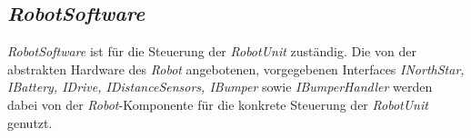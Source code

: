 \subsection{\textit{RobotSoftware}}

\emph{RobotSoftware} ist für die Steuerung der \textit{RobotUnit} zuständig. 
Die von der abstrakten Hardware des \textit{Robot} angebotenen, vorgegebenen Interfaces \textit{INorthStar, IBattery, IDrive, IDistanceSensors, IBumper} sowie
\textit{IBumperHandler} werden dabei von der \textit{Robot}-Komponente für die konkrete Steuerung der \textit{RobotUnit} genutzt.
